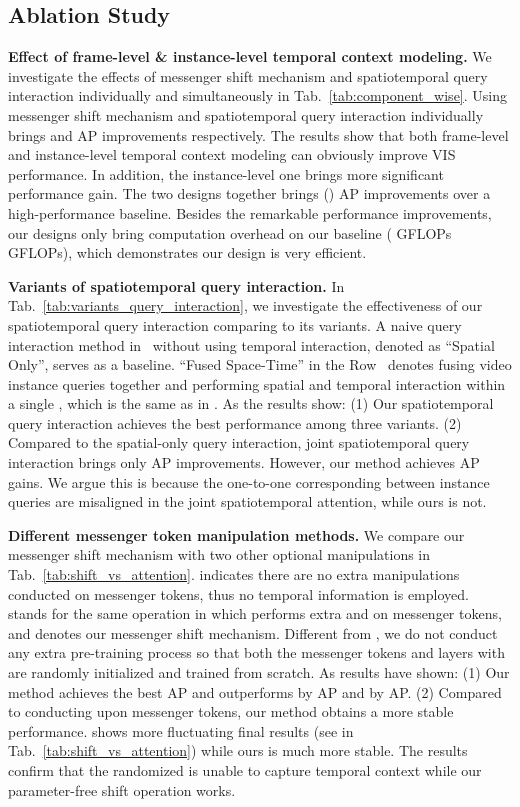 \documentclass[10pt,twocolumn,letterpaper]{article}
\begin{document}
\subsection{Ablation Study}

\noindent\textbf{Effect of frame-level \& instance-level temporal context modeling.}
We investigate the effects of messenger shift mechanism and spatiotemporal query interaction individually and simultaneously in Tab.~\ref{tab:component_wise}.
Using messenger shift mechanism and spatiotemporal query interaction individually brings  and  AP improvements respectively.
The results show that both frame-level and instance-level temporal context modeling can obviously improve VIS performance. In addition, the instance-level one brings more significant performance gain. The two designs together brings  () AP improvements over a high-performance baseline. Besides the remarkable performance improvements, our designs only bring  computation overhead on our baseline ( GFLOPs \vs  GFLOPs), which demonstrates our design is very efficient.

\noindent\textbf{Variants of spatiotemporal query interaction.}
In Tab.~\ref{tab:variants_query_interaction}, we investigate the effectiveness of our spatiotemporal query interaction comparing to its variants. A naive query interaction method in~\cite{queryinst} without using temporal interaction, denoted as ``Spatial Only'', serves as a baseline. ``Fused Space-Time'' in the Row~ denotes fusing video instance queries together and performing spatial and temporal interaction  within a single , which is the same as in \cite{vistr}. As the results show: (1) Our spatiotemporal query interaction achieves the best performance among three variants.
(2) Compared to the spatial-only query interaction, joint spatiotemporal query interaction brings only  AP improvements. However, our method achieves  AP gains. We argue this is because the one-to-one corresponding between instance queries are misaligned in the joint spatiotemporal attention, while ours is not.

\noindent\textbf{Different messenger token manipulation methods.}
We compare our messenger shift mechanism with two other optional manipulations in Tab.~\ref{tab:shift_vs_attention}.
 indicates there are no extra manipulations conducted on messenger tokens, thus no temporal information is employed.
 stands for the same operation in \cite{ifc} which performs extra  and  on messenger tokens, and  denotes our messenger shift mechanism.
Different from \cite{ifc}, we do not conduct any extra pre-training process so that both the messenger tokens and  layers with  are randomly initialized and trained from scratch.
As results have shown: (1) Our method achieves the best AP and outperforms  by  AP and  by  AP. 
(2) Compared to conducting  upon messenger tokens, our method obtains a more stable performance.  shows more fluctuating final results (see  in Tab.~\ref{tab:shift_vs_attention}) while ours is much more stable.
The results confirm that the randomized  is unable to capture temporal context while our parameter-free shift operation works.
\end{document}
